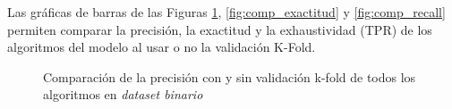 \newpage

Las gráficas de barras de las Figuras \ref{fig:comp_precision}, \ref{fig:comp_exactitud} y \ref{fig:comp_recall} permiten comparar la precisión, la exactitud y la exhaustividad (\gls{TPR}) de los algoritmos del modelo al usar o no la validación K-Fold.

\begin{figure}[h!]
    \begin{center}
    \caption{Comparación de la precisión con y sin validación k-fold de todos los algoritmos en \textit{dataset binario}}
    \label{fig:comp_precision}
    \end{center}
\end{figure}

